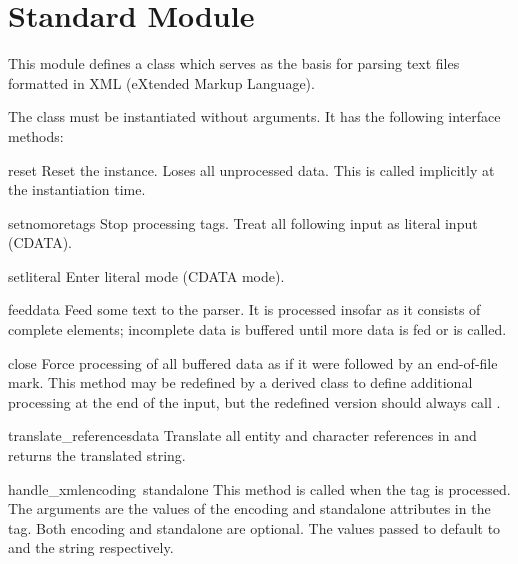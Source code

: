 \section{Standard Module }
\label{module-xmllib}

This module defines a class  which serves as the basis 
for parsing text files formatted in XML (eXtended Markup Language).

The  class must be instantiated without arguments.  It 
has the following interface methods:


\begin{funcdesc}{reset}{}
Reset the instance.  Loses all unprocessed data.  This is called
implicitly at the instantiation time.
\end{funcdesc}

\begin{funcdesc}{setnomoretags}{}
Stop processing tags.  Treat all following input as literal input
(CDATA).
\end{funcdesc}

\begin{funcdesc}{setliteral}{}
Enter literal mode (CDATA mode).
\end{funcdesc}

\begin{funcdesc}{feed}{data}
Feed some text to the parser.  It is processed insofar as it consists
of complete elements; incomplete data is buffered until more data is
fed or  is called.
\end{funcdesc}

\begin{funcdesc}{close}{}
Force processing of all buffered data as if it were followed by an
end-of-file mark.  This method may be redefined by a derived class to
define additional processing at the end of the input, but the
redefined version should always call .
\end{funcdesc}

\begin{funcdesc}{translate_references}{data}
Translate all entity and character references in  and
returns the translated string.
\end{funcdesc}

\begin{funcdesc}{handle_xml}{encoding\, standalone}
This method is called when the  tag is processed.
The arguments are the values of the encoding and standalone attributes 
in the tag.  Both encoding and standalone are optional.  The values
passed to  default to  and the string
 respectively.
\end{funcdesc}

